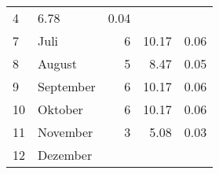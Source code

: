 \begin{longtable}{lXrrr}
       \num{4} &
       \num[round-mode=places,round-precision=2]{6.78} &
         \num[round-mode=places,round-precision=2]{0.04} \\

     7 &
     \multicolumn{1}{X}{ Juli   } &


       \num{6} &
       \num[round-mode=places,round-precision=2]{10.17} &
         \num[round-mode=places,round-precision=2]{0.06} \\

     8 &
     \multicolumn{1}{X}{ August   } &


       \num{5} &
       \num[round-mode=places,round-precision=2]{8.47} &
         \num[round-mode=places,round-precision=2]{0.05} \\

     9 &
     \multicolumn{1}{X}{ September   } &


       \num{6} &
       \num[round-mode=places,round-precision=2]{10.17} &
         \num[round-mode=places,round-precision=2]{0.06} \\

     10 &
     \multicolumn{1}{X}{ Oktober   } &


       \num{6} &
       \num[round-mode=places,round-precision=2]{10.17} &
         \num[round-mode=places,round-precision=2]{0.06} \\

     11 &
     \multicolumn{1}{X}{ November   } &


       \num{3} &
       \num[round-mode=places,round-precision=2]{5.08} &
         \num[round-mode=places,round-precision=2]{0.03} \\

     12 &
     \multicolumn{1}{X}{ Dezember   } &



\end{longtable}
